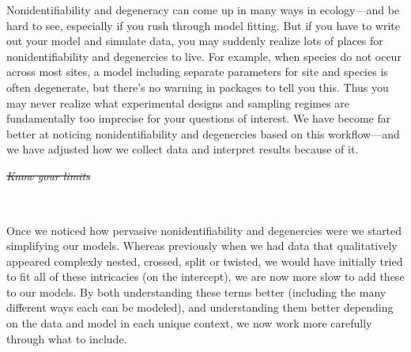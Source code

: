 \documentclass[11pt]{article}
\providecommand{\DIFaddtex}[1]{{\protect\color{blue}\uwave{#1}}} %
\providecommand{\DIFdeltex}[1]{{\protect\color{red}\sout{#1}}}                      %
\providecommand{\DIFaddbegin}{} %
\providecommand{\DIFaddend}{} %
\providecommand{\DIFdelbegin}{} %
\providecommand{\DIFdelend}{} %
\providecommand{\DIFadd}[1]{\texorpdfstring{\DIFaddtex{#1}}{#1}} %
\providecommand{\DIFdel}[1]{\texorpdfstring{\DIFdeltex{#1}}{}} %
\newcommand{\DIFscaledelfig}{0.5}
\newlength{\DIFdelgraphicswidth} %
\newlength{\DIFdelgraphicsheight} %
\newcommand{\DIFaddincludegraphics}[2][]{{\color{blue}\fbox{\DIFOincludegraphics[#1]{#2}}}} %
\newcommand{\DIFdelincludegraphics}[2][]{%
\sbox{\DIFdelgraphicsbox}{\DIFOincludegraphics[#1]{#2}}%
\settoboxwidth{\DIFdelgraphicswidth}{\DIFdelgraphicsbox} %
\settoboxtotalheight{\DIFdelgraphicsheight}{\DIFdelgraphicsbox} %
\scalebox{\DIFscaledelfig}{%
\parbox[b]{\DIFdelgraphicswidth}{\usebox{\DIFdelgraphicsbox}\\[-\baselineskip] \rule{\DIFdelgraphicswidth}{0em}}\llap{\resizebox{\DIFdelgraphicswidth}{\DIFdelgraphicsheight}{%
\setlength{\unitlength}{\DIFdelgraphicswidth}%
\begin{picture}(1,1)%
\thicklines\linethickness{2pt} %
{\color[rgb]{1,0,0}\put(0,0){\framebox(1,1){}}}%
{\color[rgb]{1,0,0}\put(0,0){\line( 1,1){1}}}%
{\color[rgb]{1,0,0}\put(0,1){\line(1,-1){1}}}%
\end{picture}%
}\hspace*{3pt}}} %
} %
\DeclareRobustCommand{\DIFaddbegin}{\DIFOaddbegin \let\includegraphics\DIFaddincludegraphics} %
\DeclareRobustCommand{\DIFaddend}{\DIFOaddend \let\includegraphics\DIFOincludegraphics} %
\DeclareRobustCommand{\DIFdelbegin}{\DIFOdelbegin \let\includegraphics\DIFdelincludegraphics} %
\DeclareRobustCommand{\DIFdelend}{\DIFOaddend \let\includegraphics\DIFOincludegraphics} %
\begin{document}
Nonidentifiability and degeneracy can come up in many ways in ecology---and be hard to see, especially if you rush through model fitting. But if you have to write out your model and simulate data, you may suddenly realize lots of places for nonidentifiability and degenercies to live. For example, when species do not occur across most sites, a model including separate parameters for site and species is often degenerate, but there's no warning in packages to tell you this. Thus you may never realize what experimental designs and sampling regimes are fundamentally too imprecise for your questions of interest. We have become far better at noticing nonidentifiability and degenercies based on this workflow---and we have adjusted how we collect data and interpret results because of it. %

\DIFdelbegin \emph{\DIFdel{Know your limits}} %
\DIFdelend \DIFaddbegin \subsection{\DIFadd{Know your limits}} \DIFaddend \\ %
Once we noticed how pervasive nonidentifiability and degenercies were we started simplifying our models. Whereas previously when we had data that qualitatively appeared complexly nested, crossed, split or twisted, we would have initially tried to fit all of these intricacies (on the intercept), we are now more slow to add these to our models. By both understanding these terms better (including the many different ways each can be modeled), and understanding them better depending on the data and model in each unique context, we now work more carefully through what to include. %
\end{document}
